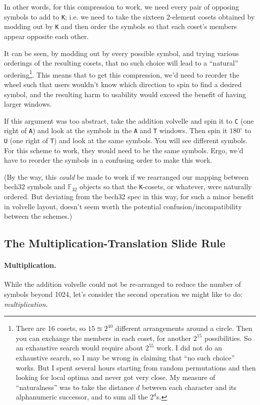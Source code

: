 \documentclass[letterpaper]{article}
\theoremstyle{xxx}
\theoremstyle{evil}
\theoremstyle{yyy}
\theoremstyle{plain}
\theoremstyle{zzz}
\newcommand{\fttwo}{\mathbb{F}_{32}}
\newcommand{\vc}[1]{\texttt{#1}} %
\begin{document}
In other words, for this compression to work, we need every pair of opposing
symbols to add to \vc{K}; i.e. we need to take the sixteen 2-element cosets
obtained by modding out by \vc{K} and then order the symbols so that each
coset's members appear opposite each other.

It can be seen, by modding out by every possible symbol, and trying various
orderings of the resulting cosets, that no such choice will lead to a
``natural'' ordering\footnote{There are 16 cosets, so $15\approxeq2^{40}$
different arrangements around a circle. Then you can exchange the members
in each coset, for another $2^{15}$ possibilities. So an exhaustive search
would require about $2^{55}$ work. I did not do an exhaustive search, so I
may be wrong in claiming that ``no such choice'' works. But I spent several
hours starting from random permutations and then looking for local optima
and never got very close. My measure of ``naturalness'' was to take the
distance $d$ between each character and its alphanumeric successor, and to
sum all the $2^d$s.}. This means that to get this compression, we'd need
to reorder the wheel such that users wouldn't know which direction to spin
to find a desired symbol, and the resulting harm to usability would exceed
the benefit of having larger windows.

If this argument was too abstract, take the addition volvelle and spin it to
\vc{C} (one right of \vc{A}) and look at the symbols in the \vc{A} and \vc{T}
windows. Then spin it $180^\circ$ to \vc{U} (one right of \vc{T}) and look
at the same symbols. You will see different symbols. For this scheme to work,
they would need to be the same symbols. Ergo, we'd have to reorder the symbols
in a confusing order to make this work.

(By the way, this \emph{could} be made to work if we rearranged our mapping
between bech32 symbols and $\fttwo$ objects so that the \vc{K}-cosets, or
whatever, were naturally ordered. But deviating from the bech32 spec in this
way, for such a minor benefit in volvelle layout, doesn't seem worth the
potential confusion/incompatibility between the schemes.)

\subsection{The Multiplication-Translation Slide Rule}

\paragraph{Multiplication.}
While the addition volvelle could not be re-arranged to reduce the number of
symbols beyond 1024, let's consider the second operation we might like to do:
\emph{multiplication}.
\end{document}
